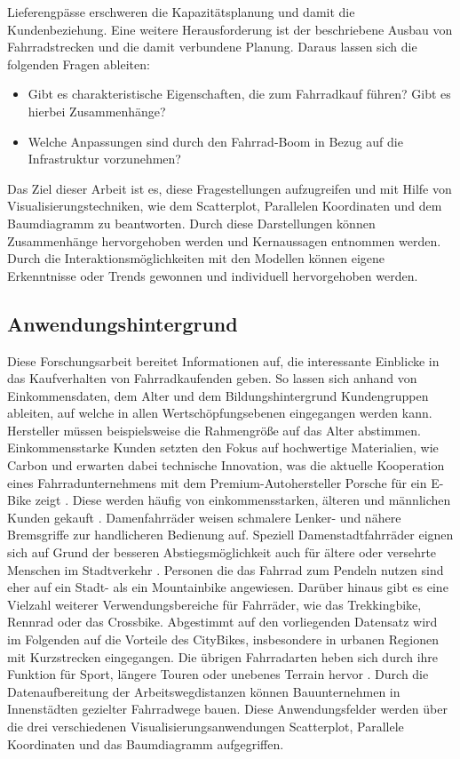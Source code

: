 \documentclass[usegeometry=true]{scrartcl}
\begin{document}
Lieferengpässe erschweren die Kapazitätsplanung und damit die Kundenbeziehung. Eine weitere Herausforderung ist der beschriebene Ausbau von Fahrradstrecken und die damit verbundene Planung. Daraus lassen sich die folgenden Fragen ableiten:
\begin{itemize}
\item Gibt es charakteristische Eigenschaften, die zum Fahrradkauf führen? Gibt es hierbei Zusammenhänge?
\item Welche Anpassungen sind durch den Fahrrad-Boom in Bezug auf die Infrastruktur vorzunehmen?
\end{itemize}
Das Ziel dieser Arbeit ist es, diese Fragestellungen  aufzugreifen und mit Hilfe von Visualisierungstechniken, wie dem Scatterplot, Parallelen Koordinaten und dem Baumdiagramm zu beantworten. Durch diese Darstellungen können Zusammenhänge hervorgehoben werden und Kernaussagen entnommen werden. Durch die Interaktionsmöglichkeiten mit den Modellen können eigene Erkenntnisse oder Trends gewonnen und individuell hervorgehoben werden.    

\subsection{Anwendungshintergrund}


Diese Forschungsarbeit bereitet Informationen auf, die interessante Einblicke in das Kaufverhalten von Fahrradkaufenden geben. So lassen sich anhand von Einkommensdaten, dem Alter und dem Bildungshintergrund Kundengruppen ableiten, auf welche in allen Wertschöpfungsebenen eingegangen werden kann. Hersteller müssen beispielsweise die Rahmengröße auf das Alter abstimmen. Einkommensstarke Kunden setzten den Fokus auf hochwertige Materialien, wie Carbon und erwarten dabei technische Innovation, was die aktuelle Kooperation eines Fahrradunternehmens mit dem Premium-Autohersteller Porsche für ein E-Bike zeigt \cite{Nachrichten.31.08.2021}. Diese werden häufig von einkommensstarken, älteren und männlichen Kunden gekauft \cite{.07.09.2021,FahrradXXLBlog.14.12.2020}. Damenfahrräder weisen schmalere Lenker- und nähere Bremsgriffe zur handlicheren Bedienung auf. Speziell Damenstadtfahrräder eignen sich auf Grund der besseren Abstiegsmöglichkeit auch für ältere oder versehrte Menschen im Stadtverkehr \cite{Radfahren.08.02.2018}.
Personen die das Fahrrad zum Pendeln nutzen sind eher auf ein Stadt- als ein Mountainbike angewiesen.  Darüber hinaus gibt es eine Vielzahl weiterer  Verwendungsbereiche für Fahrräder, wie das Trekkingbike, Rennrad oder das Crossbike. Abgestimmt auf den vorliegenden Datensatz wird im Folgenden auf die Vorteile des CityBikes, insbesondere in urbanen Regionen mit Kurzstrecken eingegangen. Die übrigen Fahrradarten heben sich durch ihre Funktion für Sport, längere Touren oder unebenes Terrain hervor \cite{.04.09.2021}. 
Durch die Datenaufbereitung der Arbeitswegdistanzen können Bauunternehmen in Innenstädten gezielter Fahrradwege bauen. Diese Anwendungsfelder werden über die drei verschiedenen Visualisierungsanwendungen Scatterplot, Parallele Koordinaten und das Baumdiagramm aufgegriffen. 
 
\end{document}
